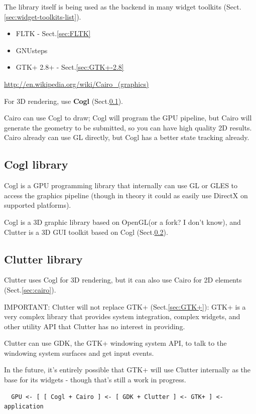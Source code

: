 The library itself is being used as the backend in many widget toolkits
(Sect.\ref{sec:widget-toolkits-list}).
\begin{itemize}
  \item FLTK - Sect.\ref{sec:FLTK}
  \item GNUsteps
  \item GTK+ 2.8+ - Sect.\ref{sec:GTK+-2.8}
\end{itemize}

\url{http://en.wikipedia.org/wiki/Cairo_(graphics)}

For 3D rendering, use {\bf Cogl} (Sect.\ref{sec:Cogl}).

Cairo can use Cogl to draw; Cogl will program the GPU pipeline, but Cairo will
generate the geometry to be submitted, so you can have high quality 2D results.
Cairo already can use GL directly, but Cogl has a better state tracking already.

\subsection{Cogl library}
\label{sec:Cogl}


Cogl is a GPU programming library that internally can use GL or GLES to access
the graphics pipeline (though in theory it could as easily use DirectX on
supported platforms).

Cogl is a 3D graphic library based on OpenGL(or a fork? I don't know), and
Clutter is a 3D GUI toolkit based on Cogl (Sect.\ref{sec:Clutter}).

\subsection{Clutter library}
\label{sec:Clutter}

Clutter uses Cogl for 3D rendering, but it can also use Cairo for 2D elements
(Sect.\ref{sec:cairo}).

IMPORTANT:
Clutter will not replace GTK+ (Sect.\ref{sec:GTK+}): GTK+ is a very complex
library that provides system integration, complex widgets, and other utility API
that Clutter has no interest in providing.


Clutter can use GDK, the GTK+ windowing system API, to talk to the windowing
system surfaces and get input events.


In the future, it's entirely possible that GTK+ will use Clutter internally as
the base for its widgets - though that's still a work in progress.
\begin{verbatim}
  GPU <- [ [ Cogl + Cairo ] <- [ GDK + Clutter ] <- GTK+ ] <- application
\end{verbatim}





